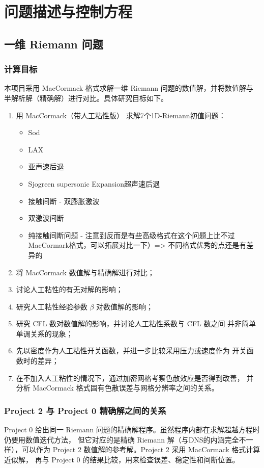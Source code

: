\section{问题描述与控制方程}

\subsection{一维 Riemann 问题}

\subsubsection{计算目标}

本项目采用 MacCormack 格式求解一维 Riemann 问题的数值解，并将数值解与
半解析解（精确解）进行对比。具体研究目标如下。

\begin{enumerate}[leftmargin=2em]
    \item 用 MacCormack（带人工粘性版） 求解7个1D-Riemann初值问题：
    \begin{itemize}
        \item Sod
        \item LAX
        \item 亚声速后退
        \item Sjogreen supersonic Expansion超声速后退
        \item 接触间断 - 双膨胀激波
        \item 双激波间断
        \item 纯接触间断问题 - 注意到反而是有些高级格式在这个问题上比不过MacCormark格式，可以拓展对比一下）=> 不同格式优秀的点还是有差异的
    \end{itemize}
    \item 将 MacCormack 数值解与精确解进行对比；
    \item 讨论人工粘性的有无对解的影响；
    \item 研究人工粘性经验参数 $\beta$ 对数值解的影响；
    \item 研究 CFL 数对数值解的影响，并讨论人工粘性系数与 CFL 数之间
    并非简单单调关系的现象；
    \item 先以密度作为人工粘性开关函数，并进一步比较采用压力或速度作为
    开关函数时的差异；
    \item 在不加入人工粘性的情况下，通过加密网格考察色散效应是否得到改善，
    并分析 MacCormack 格式固有色散误差与网格分辨率之间的关系。
\end{enumerate}

\subsubsection{Project 2 与 Project 0 精确解之间的关系}
Project 0 给出同一 Riemann 问题的精确解程序。虽然程序内部在求解超越方程时仍要用数值迭代方法，
但它对应的是精确 Riemann 解（与DNS的内涵完全不一样），可以作为 Project 2 数值解的参考解。Project 2 采用 MacCormack 格式计算近似解，
再与 Project 0 的结果比较，用来检查误差、稳定性和间断位置。

